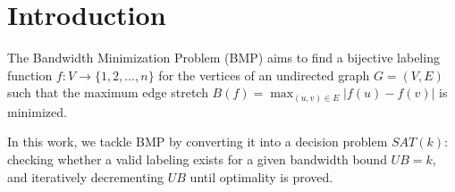 
\section{Introduction}
The Bandwidth Minimization Problem (BMP) aims to find a bijective labeling function $f: V \to \{1, 2, \dots, n\}$ for the vertices of an undirected graph $G = (V, E)$ such that the maximum edge stretch $B(f) = \max_{(u,v) \in E} |f(u) - f(v)|$ is minimized. 

In this work, we tackle BMP by converting it into a decision problem $SAT(k)$: checking whether a valid labeling exists for a given bandwidth bound $UB = k$, and iteratively decrementing $UB$ until optimality is proved.